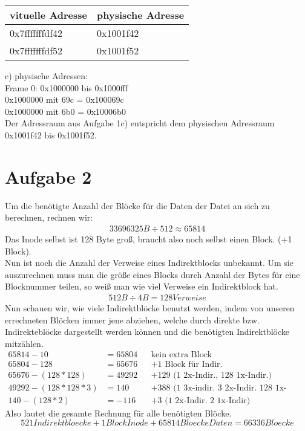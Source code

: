\documentclass{ti2}
\begin{document}
\begin{tabular}{l l}
	vituelle Adresse & physische Adresse\\
	\hline
	0x7fffffffdf42 & 0x1001f42\\
	0x7fffffffdf52 & 0x1001f52\\
\end{tabular}


c) physische Adressen:\\
Frame 0: 0x1000000 bis 0x1000fff\\
0x1000000 mit 69c = 0x100069c\\
0x1000000 mit 6b0 = 0x10006b0\\

Der Adressraum aus Aufgabe 1c) entspricht dem physischen Adressraum 0x1001f42 bis 0x1001f52.\\

\section*{Aufgabe 2}
Um die benötigte Anzahl der Blöcke für die Daten der Datei an sich zu berechnen, rechnen wir:
\begin{eqnarray*}
    33696325 B \div 512 \approx 65814
\end{eqnarray*}
Das Inode selbst ist 128 Byte groß, braucht also noch selbst einen Block. (+1 Block).\\
Nun ist noch die Anzahl der Verweise eines Indirektblocks unbekannt. 
Um sie auszurechnen muss man die größe eines Blocks durch Anzahl der Bytes für eine Blocknummer teilen, so weiß man wie viel Verweise ein Indirektblock hat. 
\begin{eqnarray*}
    512 B \div 4 B = 128 Verweise
\end{eqnarray*}
Nun schauen wir, wie viele Indirektblöcke benutzt werden, indem von unseren errechneten Blöcken immer jene abziehen, welche durch direkte bzw. Indirekteblöcke dargestellt werden können und die benötigten Indirektblöcke mitzählen.
\begin{align*} 
    65814 - 10 &= 65804 && \text{kein extra Block} \\
    65804 - 128 &= 65676 && \text{+1 Block für Indir.} \\
    65676 - (128*128) &=  49292 && \text{+129 (1 2x-Indir., 128 1x-Indir.)} \\
    49292 - (128*128*3) &= 140 && \text{+388 (1 3x-indir. 3 2x-Indir. 128 1x-Indir.)}\\
    140 - (128*2) &= -116 && \text{+3 (1 2x-Indir. 2 1x-Indir)}
\end{align*}
Also lautet die gesamte Rechnung für alle benötigten Blöcke. 
\begin{equation*}
    521Indirektbloecke + 1 BlockInode + 65814Bloecke Daten = 66336 Bloecke
\end{equation*}
\end{document}
